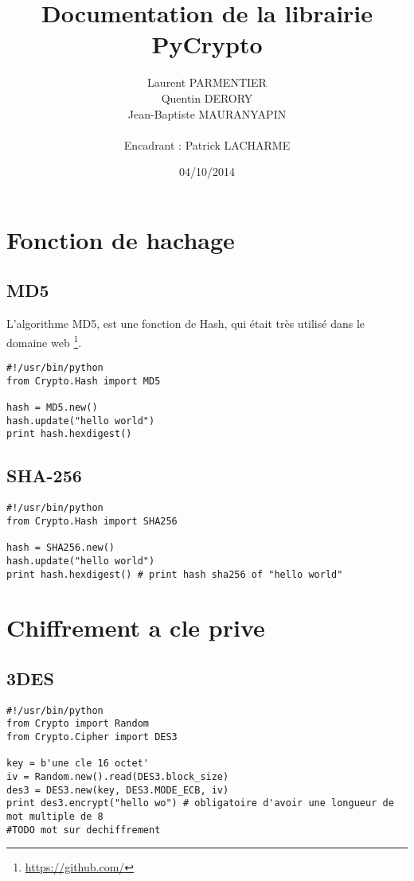 \documentclass[a4paper, 12pt]{report}
\title{\bf{Documentation de la librairie PyCrypto}}
\author{Laurent PARMENTIER\\ Quentin DERORY\\ Jean-Baptiste MAURANYAPIN \\ \\ Encadrant : Patrick LACHARME}
\date{04/10/2014}
\begin{document}
\maketitle

\tableofcontents

\chapter{Fonction de hachage}

\section{MD5}

L'algorithme MD5, est une fonction de Hash, qui était très utilisé dans le domaine web \footnote{\url{https://github.com/}}.

\begin{lstlisting}
#!/usr/bin/python 
from Crypto.Hash import MD5

hash = MD5.new()
hash.update("hello world")
print hash.hexdigest()
\end{lstlisting}

\section{SHA-256}

\begin{lstlisting}
#!/usr/bin/python
from Crypto.Hash import SHA256

hash = SHA256.new()
hash.update("hello world")
print hash.hexdigest() # print hash sha256 of "hello world"
\end{lstlisting}

\chapter{Chiffrement a cle prive}

\section{3DES}

\begin{lstlisting}
#!/usr/bin/python
from Crypto import Random
from Crypto.Cipher import DES3

key = b'une cle 16 octet'
iv = Random.new().read(DES3.block_size)
des3 = DES3.new(key, DES3.MODE_ECB, iv)
print des3.encrypt("hello wo") # obligatoire d'avoir une longueur de mot multiple de 8
#TODO mot sur dechiffrement
\end{lstlisting}
\end{document}
